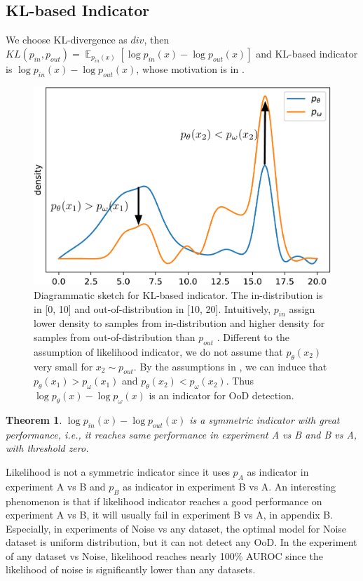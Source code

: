 \documentclass[letterpaper]{article} %
\newtheorem{theorem}{Theorem}
\newcommand{\IE}{\textit{i.e.}, }
\newcommand{\E}{\operatorname{\mathbb{E}}}
\newcommand{\pin}{p_{in}}
\newcommand{\pout}{p_{out}}
\begin{document}
\subsection{KL-based Indicator}
We choose KL-divergence as $div$, then $KL(\pin, \pout) = \E_{\pin(x)} [\log \pin(x) - \log \pout(x)]$ and KL-based indicator is $\log \pin(x) - \log \pout(x)$, whose motivation is in . 

\begin{figure}[t]
	\centering
	\includegraphics[width=0.8\columnwidth]{diagram.pdf}
	\caption{Diagrammatic sketch for KL-based indicator. The in-distribution is in [0, 10] and out-of-distribution in [10, 20]. Intuitively, $\pin$ assign lower density to samples from in-distribution and higher density for samples from out-of-distribution than $\pout$ . 
	Different to the assumption of likelihood indicator, we do not assume that $p_\theta(x_2)$ very small for $x_2 \sim \pout$. By the assumptions in , we can induce that $p_\theta(x_1) > p_\omega(x_1)$ and $p_\theta(x_2) < p_\omega(x_2)$. Thus $\log p_\theta(x) - \log p_\omega(x)$ is an indicator for OoD detection. }
	\label{fig3}
\end{figure}

\begin{theorem}\label{thm1}
	$\log \pin(x) - \log \pout(x)$ is a symmetric indicator with great performance, \IE it reaches same performance in experiment A vs B and B vs A, with threshold zero. 
\end{theorem}
Likelihood is not a symmetric indicator since it uses $p_A$ as indicator in experiment A vs B and $p_B$ as indicator in experiment B vs A. An interesting phenomenon is that if likelihood indicator reaches a good performance on experiment A vs B, it will usually fail in experiment B vs A, in appendix B. Especially, in experiments of Noise vs any dataset, the optimal model for Noise dataset is uniform distribution, but it can not detect any OoD. In the experiment of any dataset vs Noise, likelihood reaches nearly 100\% AUROC since the likelihood of noise is significantly lower than any datasets. 
\end{document}
